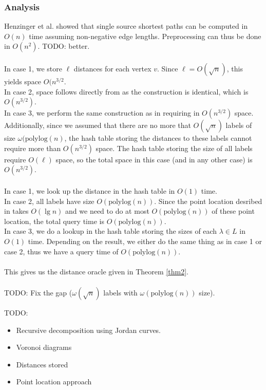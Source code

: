 \subsubsection{Analysis}
Henzinger et al. showed that single source shortest paths can be computed in $O(n)$ time
\cite{henzinger1997faster} assuming non-negative edge lengths. Preprocessing can thus be done in $O(n^2)$. TODO: better. \\
\\
In case 1, we store $\ell$ distances for each vertex $v$. Since $\ell=O(\sqrt{n})$, this
yields space $O(n^{3/2}$. \\
In case 2, space follows directly from \cite{gawrychowski2017better} as the construction
is identical, which is $O(n^{3/2})$. \\
In case 3, we perform the same construction as in \cite{gawrychowski2017better} requiring
in $O(n^{3/2})$ space. Additionally, since we assumed that there are no more that
$O(\sqrt{n})$ labels of size $\omega(\text{polylog}(n)$, the hash table storing the
distances to these labels cannot require more than $O(n^{3/2})$ space. The hash table
storing the size of all labels require $O(\ell)$ space, so the total space
in this case (and in any other case) is $O(n^{3/2})$.\\
\\
In case 1, we look up the distance in the hash table in $O(1)$ time.\\
In case 2, all labels have size $O(\text{polylog}(n))$. Since the point location desribed
in \cite{gawrychowski2017better} takes $O(\lg n)$ and we need to do at most
$O(\text{polylog}(n))$ of these point location, the total query time is
$O(\text{polylog}(n))$. \\
In case 3, we do a lookup in the hash table storing the sizes of each $\lambda\in L$ in
$O(1)$ time. Depending on the result, we either do the same thing as in case 1 or case 2,
thus we have a query time of $O(\text{polylog}(n))$. \\
\\
This gives us the distance oracle given in Theorem \ref{thm2}. \\
\\
TODO: Fix the gap ($\omega(\sqrt{n})$ labels with $\omega(\text{polylog}(n))$ size).

TODO:
\begin{itemize}
  \item Recursive decomposition using Jordan curves.
  \item Voronoi diagrams
  \item Distances stored
  \item Point location approach
\end{itemize}
